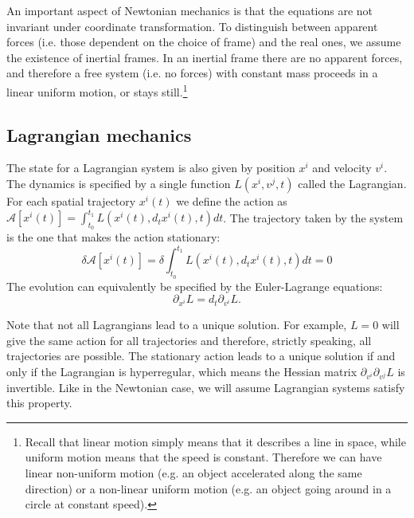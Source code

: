 An important aspect of Newtonian mechanics is that the equations are not invariant under coordinate transformation. To distinguish between apparent forces (i.e. those dependent on the choice of frame) and the real ones, we assume the existence of inertial frames. In an inertial frame there are no apparent forces, and therefore a free system (i.e. no forces) with constant mass proceeds in a linear uniform motion, or stays still.\footnote{Recall that linear motion simply means that it describes a line in space, while uniform motion means that the speed is constant. Therefore we can have linear non-uniform motion (e.g. an object accelerated along the same direction) or a non-linear uniform motion (e.g. an object going around in a circle at constant speed).}

\subsection{Lagrangian mechanics}

The state for a Lagrangian system is also given by position $x^i$ and velocity $v^i$. The dynamics is specified by a single function $L(x^i, v^j, t)$ called the Lagrangian. For each spatial trajectory $x^i(t)$ we define the action as $\mathcal{A}[x^i(t)] = \int_{t_0}^{t_1} L(x^i(t), d_t x^i(t), t) dt$. The trajectory taken by the system is the one that makes the action stationary:
\begin{equation}
\delta \mathcal{A}[x^i(t)] = \delta \int_{t_0}^{t_1} L\left(x^i(t), d_t x^i(t), t\right) dt=0
\end{equation}
The evolution can equivalently be specified by the Euler-Lagrange equations:
\begin{equation}\label{rp-cm-EulerLagrange}
	\partial_{x^i}L=d_t \partial_{v^i} L.
\end{equation}


Note that not all Lagrangians lead to a unique solution. For example, $L=0$ will give the same action for all trajectories and therefore, strictly speaking, all trajectories are possible. The stationary action leads to a unique solution if and only if the Lagrangian is hyperregular, which means the Hessian matrix $\partial_{v^i}\partial_{v^j} L$ is invertible. Like in the Newtonian case, we will assume Lagrangian systems satisfy this property.

